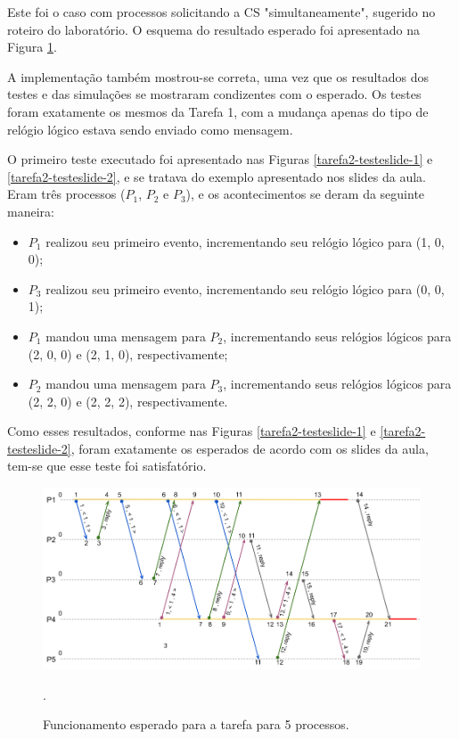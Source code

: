 \documentclass[conference]{IEEEtran}
\begin{document}
	Este foi o caso com processos solicitando a CS "simultaneamente", sugerido no roteiro do laboratório. O esquema do resultado esperado foi apresentado na Figura \ref{ex2}.

	A implementação também mostrou-se correta, uma vez que os resultados dos testes e das simulações se mostraram condizentes com o esperado. Os testes foram exatamente os mesmos da Tarefa 1, com a mudança apenas do tipo de relógio lógico estava sendo enviado como mensagem.
	
	O primeiro teste executado foi apresentado nas Figuras \ref{tarefa2-testeslide-1} e \ref{tarefa2-testeslide-2}, e se tratava do exemplo apresentado nos slides da aula. Eram três processos ($P_1$, $P_2$ e $P_3$), e os acontecimentos se deram da seguinte maneira:
	
\begin{itemize}
\item $P_1$ realizou seu primeiro evento, incrementando seu relógio lógico para (1, 0, 0);
\item $P_3$ realizou seu primeiro evento, incrementando seu relógio lógico para (0, 0, 1);
\item $P_1$ mandou uma mensagem para $P_2$, incrementando seus relógios lógicos para (2, 0, 0) e (2, 1, 0), respectivamente;
\item $P_2$ mandou uma mensagem para $P_3$, incrementando seus relógios lógicos para (2, 2, 0) e (2, 2, 2), respectivamente.
\end{itemize}

	Como esses resultados, conforme nas Figuras \ref{tarefa2-testeslide-1} e \ref{tarefa2-testeslide-2}, foram exatamente os esperados de acordo com os slides da aula, tem-se que esse teste foi satisfatório.

\begin{figure}[H]
\centering
\centerline{\includegraphics[scale=0.25]{imagens/ex2.png}}
\caption{Funcionamento esperado para a tarefa para 5 processos.}.
\label{ex2}
\end{figure}
\end{document}
